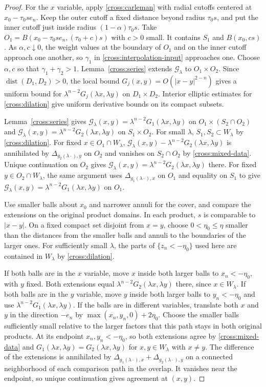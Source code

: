 \documentclass[11pt,a4paper]{article}
\theoremstyle{definition}
\theoremstyle{remark}
\DeclareMathOperator{\dist}{dist}
\numberwithin{equation}{section}
\begin{document}
\begin{proof}
For the $x$ variable, apply \eqref{cross:carleman} with radial cutoffs centered
at $x_0-\tau_0se_n$.  Keep the outer cutoff a fixed distance beyond
radius $\tau_0s$, and put the inner cutoff just inside radius
$(1-\alpha)\tau_0s$.  Take $O_1=B(x_0-\tau_0se_n,(\tau_0+c)s)$
with $c>0$ small. It contains $S_1$ and
$B(x_0,cs)$.
As $\alpha,c\downarrow0$, the weight values at the boundary of $O_1$
and on the inner cutoff approach one another, so $\gamma_1$ in
\eqref{cross:interpolation-input} approaches one. Choose $\alpha,c$ so that
$\gamma_1+\gamma_2>1$.
Lemma~\ref{cross:series} extends $\mathcal G_\lambda$ to
$O_1\times O_2$. Since $\dist(D_1,D_2)>0$, the local bound
$G_j(x,y)=O(|x-y|^{2-n})$ gives a uniform bound for
$\lambda^{n-2}G_j(\lambda x,\lambda y)$ on $D_1\times D_2$.
Interior elliptic estimates for \eqref{cross:dilation} give
uniform derivative bounds on its compact subsets.

Lemma~\ref{cross:series} gives
$\mathcal G_\lambda(x,y)=\lambda^{n-2}G_1(\lambda x,\lambda y)$ on
$O_1\times(S_2\cap O_2)$ and
$\mathcal G_\lambda(x,y)=\lambda^{n-2}G_2(\lambda x,\lambda y)$ on
$S_1\times O_2$. For small $\lambda$, $S_1,S_2\subset W_\lambda$
by \eqref{cross:dilation}. For fixed $x\in O_1\cap W_\lambda$,
$\mathcal G_\lambda(x,y)-\lambda^{n-2}G_2(\lambda x,\lambda y)$ is
annihilated by $\Delta_{g_2(\lambda\cdot),y}$ on $O_2$ and vanishes on
$S_2\cap O_2$ by \eqref{cross:mixed-data}. Unique continuation on
$O_2$ gives $\mathcal G_\lambda(x,y)=\lambda^{n-2}G_2(\lambda x,\lambda y)$
there. For fixed $y\in O_2\cap W_\lambda$, the same argument uses
$\Delta_{g_1(\lambda\cdot),x}$ on $O_1$ and equality on $S_1$ to give
$\mathcal G_\lambda(x,y)=\lambda^{n-2}G_1(\lambda x,\lambda y)$ on $O_1$.

Use smaller balls about $x_0$ and narrower annuli for the cover,
and compare the extensions on the original product domains.
In each product, $s$ is comparable to $|x-y|$.
On a fixed compact set disjoint from $x=y$, choose
$0<\eta_0\le\eta$ smaller than the distances from the smaller balls
and annuli to the boundaries of the larger ones. For sufficiently
small $\lambda$, the parts of $\{z_n<-\eta_0\}$ used here are contained
in $W_\lambda$ by \eqref{cross:dilation}.

If both balls are in the $x$ variable, move $x$ inside both larger
balls to $x_n<-\eta_0$, with $y$ fixed. Both extensions equal
$\lambda^{n-2}G_2(\lambda x,\lambda y)$ there, since $x\in W_\lambda$.
If both balls are in the $y$ variable, move $y$ inside both larger
balls to $y_n<-\eta_0$ and use $\lambda^{n-2}G_1(\lambda x,\lambda y)$.
If the balls are in different variables, translate
both $x$ and $y$ in the direction $-e_n$ by
$\max(x_n,y_n,0)+2\eta_0$. Choose the smaller balls sufficiently small
relative to the larger factors that this path stays in both original
products. At its endpoint $x_n,y_n<-\eta_0$, so both extensions agree
by \eqref{cross:mixed-data} and $G_1(\lambda x,\lambda y)=G_2(\lambda x,\lambda y)$
for $x,y\in W_\lambda$ with $x\ne y$.
The difference of the extensions is annihilated by
$\Delta_{g_1(\lambda\cdot),x}+\Delta_{g_2(\lambda\cdot),y}$ on a
connected neighborhood of each comparison path in the overlap.
It vanishes near the endpoint, so unique continuation gives
agreement at $(x,y)$.


\end{proof}
\end{document}
